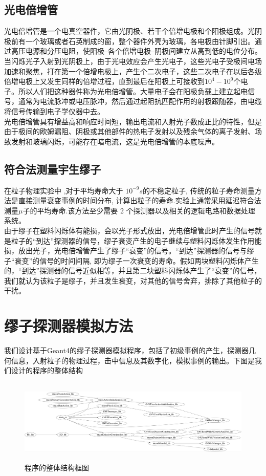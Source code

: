 \documentclass[UTF8]{ctexart}
\begin{document}
\subsection{光电倍增管}

光电倍增管是一个电真空器件，它由光阴极、若干个倍增电极和个阳极组成。光阴极前有一个玻璃或者石英制成的窗，整个器件外壳为玻璃，各电极由针脚引出。通过高压电源和分压电阻，使阳极--各个倍增电极--阴极间建立从高到低的电位分布。当闪烁光子入射到光阴极上，由于光电效应会产生光电子，这些光电子受极间电场加速和聚焦，打在第一个倍增电极上，产生个二次电子，这些二次电子在以后各级倍增电极上又发生同样的倍增过程，直到最后在阳极上可接收到$10^4-10^9$个电子。所以人们把这种器件称为光电倍增管。大量电子会在阳极负载上建立起电信号，通常为电流脉冲或电压脉冲，然后通过起阻抗匹配作用的射极跟随器，由电缆将信号传输到电子学仪器中去。\\

光电倍增管具有增益高和响应时间短，输出电流和入射光子数成正比的特性，但是由于极间的欧姆漏阻、阴极或其他部件的热电子发射以及残余气体的离子发射、场致发射和玻璃闪烁，可能存在暗电流，这是光电倍增管的本底噪声。

\subsection{符合法测量宇生缪子}

在粒子物理实验中 ,对于平均寿命大于 $10^{-9}s$的不稳定粒子, 传统的粒子寿命测量方法是直接测量衰变事例的时间分布, 计算出粒子的寿命.实验上通常采用延迟符合法测量$\mu$子的平均寿命.该方法至少需要 2 个探测器以及相关的逻辑电路和数据处理系统。\cite{5}\\

由于缪子在塑料闪烁体有能损，会以光子形式放出，光电倍增管此时产生的信号就是粒子的“到达”探测器的信号，缪子衰变产生的电子继续与塑料闪烁体发生作用能损，放出光子，光电倍增管产生了缪子“衰变”的信号。“到达”探测器的信号与缪子“衰变”的信号的时间间隔, 即为缪子一次衰变的寿命。假如两块塑料闪烁体产生的，“到达”探测器的信号近似相等，并且第二块塑料闪烁体产生了“衰变”的信号，我们就认为该粒子是缪子，并且发生衰变，对其他的信号舍弃，排除了其他粒子的干扰。

\section{缪子探测器模拟方法}

我们设计基于Geant4的缪子探测器模拟程序，包括了初级事例的产生，探测器几何信息，入射粒子的物理过程，击中信息及其数字化，模拟事例的输出。下图是我们设计的程序的整体结构\\
\begin{figure}[h]
    \centering\includegraphics[width=120mm,height=40mm]{pic/main.jpg}
    \caption{程序的整体结构框图}
\end{figure}
\end{document}
